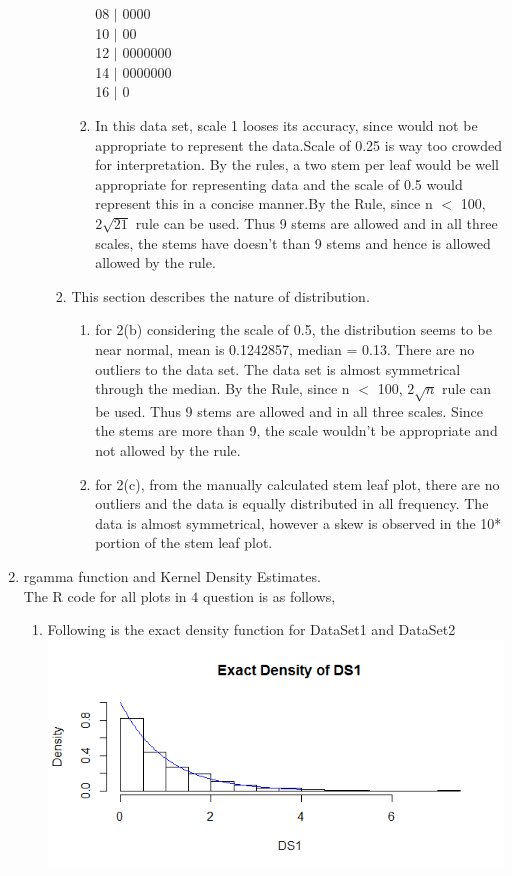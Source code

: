 \documentclass{article}
\begin{document}
\begin{enumerate}
\begin{enumerate}
\begin{enumerate}
\begin{enumerate}
  08 $|$ 0000\\
  10 $|$ 00\\
  12 $|$ 0000000\\
  14 $|$ 0000000\\
  16 $|$ 0\\
\item In this data set, scale 1 looses its accuracy, since would not be appropriate to represent the data.Scale of 0.25 is way too crowded for interpretation. By the rules, a two stem per leaf would be well appropriate for representing data and the scale of 0.5 would represent this in a concise manner.By the Rule, since n $<$ 100, $2\sqrt{21}$ rule can be used. Thus 9 stems are allowed and in all three scales, the stems have doesn't than 9 stems and hence is allowed allowed by the rule.
\end{enumerate}
\item This section describes the nature of distribution.
\begin{enumerate}
\item for 2(b) considering the scale of 0.5, the distribution seems to be near normal, mean is 0.1242857, median = 0.13. There are no outliers to the data set. The data set is almost symmetrical through the median. By the Rule, since n $<$ 100, $2\sqrt{n}$ rule can be used. Thus 9 stems are allowed and in all three scales. Since the stems are more than 9, the scale wouldn't be appropriate and not allowed by the rule.
\item for 2(c), from the manually calculated stem leaf plot, there are no outliers and the data is equally distributed in all frequency. The data is almost symmetrical, however a skew is observed in the 10* portion of the stem leaf plot.
\end{enumerate}
\end{enumerate}
\end{enumerate}
\item rgamma function and Kernel Density Estimates.\\The R code for all plots in $4$ question is as follows,

\begin{enumerate}
\item Following is the exact density function for DataSet1 and DataSet2\\
\includegraphics[scale=0.5]{curve1}

\end{enumerate}
\end{enumerate}
\end{document}
